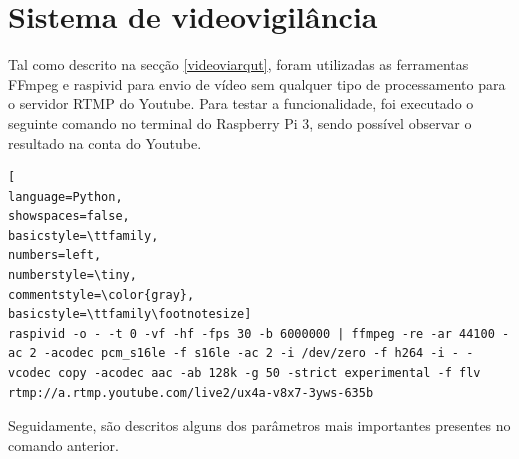 












\section{Sistema de videovigilância}


Tal como descrito na secção \ref{videoviarqut}, foram utilizadas as ferramentas FFmpeg e raspivid para envio de vídeo sem qualquer tipo de processamento para o servidor \ac{RTMP} do Youtube. Para testar a funcionalidade, foi executado o seguinte comando no terminal do Raspberry Pi 3, sendo possível observar o resultado na conta do Youtube.


\begin{lstlisting}[
language=Python,
showspaces=false,
basicstyle=\ttfamily,
numbers=left,
numberstyle=\tiny,
commentstyle=\color{gray},
basicstyle=\ttfamily\footnotesize]
raspivid -o - -t 0 -vf -hf -fps 30 -b 6000000 | ffmpeg -re -ar 44100 -ac 2 -acodec pcm_s16le -f s16le -ac 2 -i /dev/zero -f h264 -i - -vcodec copy -acodec aac -ab 128k -g 50 -strict experimental -f flv rtmp://a.rtmp.youtube.com/live2/ux4a-v8x7-3yws-635b

\end{lstlisting}






Seguidamente, são descritos alguns dos parâmetros mais importantes presentes no comando anterior\cite{streamlive}. 

